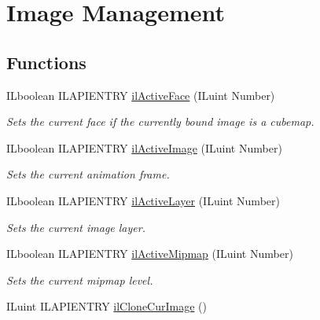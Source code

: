 \hypertarget{group__image__mgt}{\section{Image Management}
\label{group__image__mgt}
}
\subsection*{Functions}
\begin{DoxyCompactItemize}
\item 
I\-Lboolean I\-L\-A\-P\-I\-E\-N\-T\-R\-Y \hyperlink{group__image__mgt_ga77651f86dfb248dddfead0c095ed2c12}{il\-Active\-Face} (I\-Luint Number)
\begin{DoxyCompactList}\small\item\em Sets the current face if the currently bound image is a cubemap. \end{DoxyCompactList}\item 
I\-Lboolean I\-L\-A\-P\-I\-E\-N\-T\-R\-Y \hyperlink{group__image__mgt_ga1ea5b35280be4128de20e7218108d669}{il\-Active\-Image} (I\-Luint Number)
\begin{DoxyCompactList}\small\item\em Sets the current animation frame. \end{DoxyCompactList}\item 
I\-Lboolean I\-L\-A\-P\-I\-E\-N\-T\-R\-Y \hyperlink{group__image__mgt_gad362b9264fd40f787f2748237b214f96}{il\-Active\-Layer} (I\-Luint Number)
\begin{DoxyCompactList}\small\item\em Sets the current image layer. \end{DoxyCompactList}\item 
I\-Lboolean I\-L\-A\-P\-I\-E\-N\-T\-R\-Y \hyperlink{group__image__mgt_ga02171eee15fcaf5fb1d1741307e7f8bc}{il\-Active\-Mipmap} (I\-Luint Number)
\begin{DoxyCompactList}\small\item\em Sets the current mipmap level. \end{DoxyCompactList}\item 
\hypertarget{group__image__mgt_gae0771d03e54685b692b1103a1b29f80c}{I\-Luint I\-L\-A\-P\-I\-E\-N\-T\-R\-Y \hyperlink{group__image__mgt_gae0771d03e54685b692b1103a1b29f80c}{il\-Clone\-Cur\-Image} ()}\label{group__image__mgt_gae0771d03e54685b692b1103a1b29f80c}


\end{DoxyCompactItemize}
